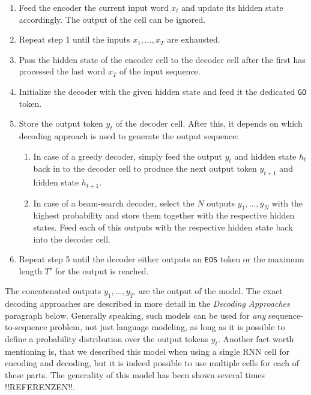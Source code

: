\begin{enumerate}[noitemsep]
	\item Feed the encoder the current input word $x_t$ and update its hidden state accordingly. The output of the cell can be ignored.
	\item Repeat step 1 until the inputs $x_1,\dots,x_{T}$ are exhausted.
	\item Pass the hidden state of the encoder cell to the decoder cell after the first has processed the last word $x_T$ of the input sequence.
	\item Initialize the decoder with the given hidden state and feed it the dedicated \texttt{GO} token.
	\item Store the output token $y_t$ of the decoder cell. After this, it depends on which decoding approach is used to generate the output sequence:
	\begin{enumerate}
		\item In case of a greedy decoder, simply feed the output $y_t$ and hidden state $h_t$ back in to the decoder cell to produce the next output token $y_{t+1}$ and hidden state $h_{t+1}$.
		\item In case of a beam-search decoder, select the $N$ outputs $y_1,\dots,y_{N}$ with the highest probability and store them together with the respective hidden states. Feed each of this outputs with the respective hidden state back into the decoder cell.
	\end{enumerate}
	\item Repeat step 5 until the decoder either outputs an \texttt{EOS} token or the maximum length $T'$ for the output is reached.
\end{enumerate}

The concatenated outputs $y_1,...,y_{T'}$ are the output of the model. The exact decoding approaches are described in more detail in the \emph{Decoding Approaches} paragraph below. Generally speaking, such models can be used for \emph{any} sequence-to-sequence problem, not just language modeling, as long as it is possible to define a probability distribution over the output tokens $y_t$. Another fact worth mentioning is, that we described this model when using a single RNN cell for encoding and decoding, but it is indeed possible to use multiple cells for each of these parts. The generality of this model has been shown several times !!REFERENZEN!!.

